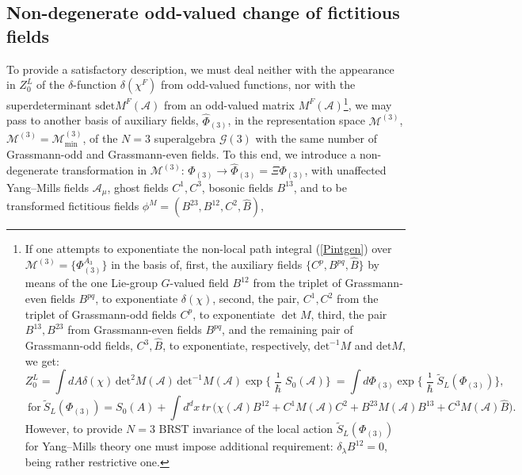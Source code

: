 \documentclass[10pt]{article}
\begin{document}
\subsection{Non-degenerate odd-valued change of fictitious fields}\label{N3oddfict}

To provide a satisfactory description, we must deal neither with the appearance
in $Z^L_0$ of the $\delta$-function $\delta(\chi^F)$ from odd-valued functions,
nor with the superdeterminant $\mathrm{sdet}M^F(\mathcal{A})$ from an odd-valued
matrix $M^F(\mathcal{A})$\footnote{If one attempts to exponentiate
the non-local path integral  (\ref{Pintgen}) over $\mathcal{M}^{(3)}= \{\Phi^{A_3}_{(3)}\}$
in the basis of, first, the auxiliary fields $\{C^p, B^{pq}, \widehat{B}\}$ by means of
the one Lie-group $G$-valued  field $B^{12}$ from the triplet of Grassmann-even
fields $B^{pq}$, to exponentiate $\delta(\chi)$, second, the pair, $C^{1},  C^{2}$
from the triplet of Grassmann-odd fields $C^{p}$, to exponentiate  $\det M$,
third, the pair $B^{13}, B^{23}$ from Grassmann-even fields $B^{pq}$,
and the remaining pair of Grassmann-odd fields, $C^{ {3}}, \widehat{B} $,  to exponentiate,
respectively, $\mathrm{det}^{-1}{}M$ and $\mathrm{det}{}M$, we get: $$ Z^L_0 = \int dA \delta(\chi)\,
\mathrm{det}^2 M(\mathcal{A}) \, \mathrm{det}^{-1} M(\mathcal{A})
\exp\Big\{\frac{\imath}{\hbar}S_0(\mathcal{A})\Big\} \ = \int d\Phi _{(3)}
\exp\Big\{\frac{\imath}{\hbar}\widetilde{S}_L(\Phi_{(3)})\Big\}, $$%
 $$ \ \mathrm{for} \ \widetilde{S}_L(\Phi_{(3)}) = S_0(A) +
 \int d^dx \,tr\, \Big(\chi(\mathcal{A}) {B}^{12} + C^{1}M(\mathcal{A}) C^{2}
 + B^{23}M(\mathcal{A}) B^{13} +C^{3}M(\mathcal{A})\widehat{B}\Big).%
$$ However, to provide  $N=3$ BRST invariance of the local action
$\widetilde{S}_L(\Phi_{(3)})$ for Yang--Mills theory one must impose  additional
requirement:   $\delta_\lambda  B^{12}  = 0 $, being rather restrictive one.},
we may pass to another basis of auxiliary fields, $\widehat{\Phi}_{(3)}$,
in the representation space $\mathcal{M}^{(3)}$, $\mathcal{M}^{(3)} =\mathcal{M}^{(3)}_{\mathrm{min}}$,  of the $N=3$  superalgebra
${\mathcal{G}}(3)$ with the same number of Grassmann-odd and Grassmann-even fields.
To this end, we introduce a non-degenerate transformation in $\mathcal{M}^{(3)}$:
${\Phi}_{(3)} \to \widehat{\Phi}_{(3)}=\Xi {\Phi}_{(3)}$, with
unaffected Yang--Mills fields $\mathcal{A}_\mu$, ghost fields $C^1, C^3$, bosonic fields
$B^{13}$, and to be transformed fictitious fields
$\phi^M = (B^{23}, B^{12}, C^{ 2}, \widehat{B}{})$,
\end{document}

